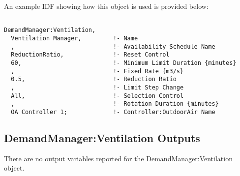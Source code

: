 An example IDF showing how this object is used is provided below:

\begin{lstlisting}

DemandManager:Ventilation,
  Ventilation Manager,         !- Name
  ,                            !- Availability Schedule Name
  ReductionRatio,              !- Reset Control
  60,                          !- Minimum Limit Duration {minutes}
  ,                            !- Fixed Rate {m3/s}
  0.5,                         !- Reduction Ratio
  ,                            !- Limit Step Change
  All,                         !- Selection Control
  ,                            !- Rotation Duration {minutes}
  OA Controller 1;             !- Controller:OutdoorAir Name
\end{lstlisting}

\subsection{DemandManager:Ventilation Outputs}\label{demandmanagerventilation-outputs}

There are no output variables reported for the \hyperref[demandmanagerventilation]{DemandManager:Ventilation} object.
